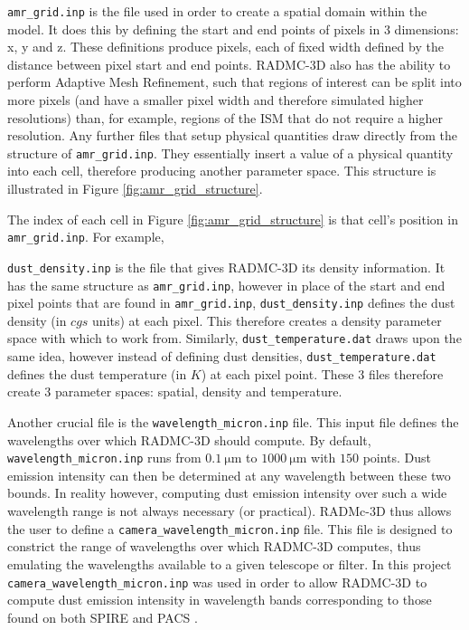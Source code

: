 \documentclass{report}
\begin{document}
\texttt{amr\_grid.inp} is the file used in order to create a spatial domain within the model. It does this by defining the start and end points of pixels in 3 dimensions: x, y and z. These definitions produce pixels, each of fixed width defined by the distance between pixel start and end points. RADMC-3D also has the ability to perform Adaptive Mesh Refinement, such that regions of interest can be split into more pixels (and have a smaller pixel width and therefore simulated higher resolutions) than, for example, regions of the ISM that do not require a higher resolution. Any further files that setup physical quantities draw directly from the structure of \texttt{amr\_grid.inp}. They essentially \textquotesingle insert \textquotesingle a value of a physical quantity into each cell, therefore producing another parameter space. This structure is illustrated in Figure \ref{fig:amr_grid_structure}.

The index of each cell in Figure \ref{fig:amr_grid_structure} is that cell's position in \texttt{amr\_grid.inp}. For example,

\texttt{dust\_density.inp} is the file that gives RADMC-3D its density information. It has the same structure as \texttt{amr\_grid.inp}, however in place of the start and end pixel points that are found in \texttt{amr\_grid.inp}, \texttt{dust\_density.inp} defines the dust density (in $cgs$ units) at each pixel. This therefore creates a density parameter space with which to work from. Similarly, \texttt{dust\_temperature.dat} draws upon the same idea, however instead of defining dust densities, \texttt{dust\_temperature.dat} defines the dust temperature (in $K$) at each pixel point. These 3 files therefore create 3 parameter spaces: spatial, density and temperature.

Another crucial file is the \texttt{wavelength\_micron.inp} file. This input file defines the wavelengths over which RADMC-3D should compute. By default, \texttt{wavelength\_micron.inp} runs from $\SI{0.1}{\micro\meter}$ to $\SI{1000}{\micro\meter}$ with $150$ points. Dust emission intensity can then be determined at any wavelength between these two bounds. In reality however, computing dust emission intensity over such a wide wavelength range is not always necessary (or practical). RADMc-3D thus allows the user to define a \texttt{camera\_wavelength\_micron.inp} file. This file is designed to constrict the range of wavelengths over which RADMC-3D computes, thus emulating the wavelengths available to a given telescope or filter. In this project \texttt{camera\_wavelength\_micron.inp} was used in order to allow RADMC-3D to compute dust emission intensity in wavelength bands corresponding to those found on both SPIRE \parencite{SPIRE} and PACS \parencite{PACS}.
\end{document}
